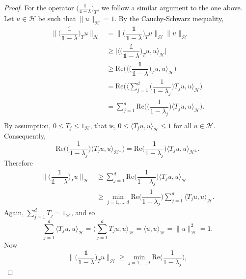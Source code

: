 \documentclass[11pt, reqno]{amsart}
\newcommand\1{\boldsymbol {1}}
\numberwithin{equation}{section}
\begin{document}
\begin{proof}
 For the operator $\big(\frac{\mathds{1}}{\mathds{1}-\lambda}\big)_{T}$, we follow a similar argument to the one above. Let $u\in\mathcal{H}$ be such that $\| u \|_{\mathcal{H}} =1$. By the Cauchy-Schwarz inequality,
\begin{align*}
\bigg\| \bigg(\dfrac{\mathds{1}}{\mathds{1}-\lambda}\bigg)_{T}u \bigg\|_{\mathcal{H}} 	& = \bigg\| \bigg(\dfrac{\mathds{1}}{\mathds{1}-\lambda}\bigg)_{T}u \bigg\|_{\mathcal{H}} \| u \|_{\mathcal{H}} \\
				& \geq \bigg\lvert \bigg\langle \bigg(\dfrac{\mathds{1}}{\mathds{1}-\lambda}\bigg)_{T}u,u \bigg\rangle_{\mathcal{H}} \bigg\rvert 	\\
				& \geq \mathrm{Re}\Bigg(\bigg\langle\bigg(\dfrac{\mathds{1}}{\mathds{1}-\lambda}\bigg)_{T}u,u\bigg\rangle_{\mathcal{H}}\Bigg) \\
				& = \mathrm{Re}\Bigg(\bigg\langle \sum_{j=1}^{d}\bigg(\dfrac{1}{1-\lambda_{j}}\bigg)T_{j}u,u\bigg\rangle_{\mathcal{H}}\Bigg)\\
				& = \sum_{j=1}^{d}\mathrm{Re}\Bigg(\bigg(\dfrac{1}{1-\lambda_{j}}\bigg)\Big\langle T_{j}u,u\Big\rangle_{\mathcal{H}}\Bigg).\\
\end{align*}
By assumption, $0\leq T_{j} \leq 1_{\mathcal{H}}$, that is, $0\leq\langle T_{j}u,u\rangle_{\mathcal{H}}\leq 1$ for all $u\in\mathcal{H}$. Consequently,
$$\mathrm{Re}\Bigg(\bigg(\dfrac{1}{1-\lambda_{j}}\bigg)\Big\langle T_{j}u,u\Big\rangle_{\mathcal{H}^{\perp
}}\Bigg) = \mathrm{Re}\bigg(\dfrac{1}{1-\lambda_{j}}\bigg)\Big\langle T_{j}u,u\Big\rangle_{\mathcal{H}^{\perp
}}.$$
Therefore
\begin{align*}
\bigg\| \bigg(\dfrac{\mathds{1}}{\mathds{1}-\lambda}\bigg)_{T}u \bigg\|_{\mathcal{H}} & \geq \sum_{j=1}^{d} \mathrm{Re}\bigg(\dfrac{1}{1-\lambda_{j}}\bigg)  \Big\langle T_{j}u,u\Big\rangle_{\mathcal{H}} \\
				& \geq \underset{j=1,\hdots, d}{\min}\mathrm{Re}\bigg(\dfrac{1}{1-\lambda_{j}}\bigg) \sum_{j=1}^{d}\Big\langle T_{j}u,u\Big\rangle_{\mathcal{H}}.
\end{align*}
Again, $\sum_{j=1}^{d}T_{j}=1_{\mathcal{H}}$, and so
$$ \sum_{j=1}^{d}\big\langle T_{j}u,u\big\rangle_{\mathcal{H}} = \bigg\langle \sum_{j=1}^{d}T_{j}u,u \bigg\rangle_{\mathcal{H}} = \langle u,u \rangle_{\mathcal{H}} = \| u \|_{\mathcal{H}}^{2}=1.$$
Now
\begin{equation}\label{firstlineininvertibilityargumentxo}
\bigg\| \bigg(\dfrac{\mathds{1}}{\mathds{1}-\lambda}\bigg)_{T}u \bigg\|_{\mathcal{H}} \geq \underset{j=1,\hdots, d}{\min} \mathrm{Re}\bigg(\dfrac{1}{1-\lambda_{j}}\bigg),

\end{equation}
\end{proof}
\end{document}
